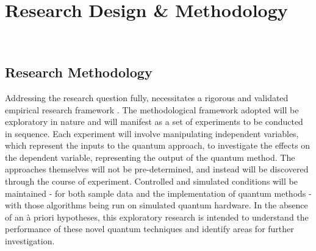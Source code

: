 \section{Research Design \& Methodology}~\label{sec:design}
\subsection{Research Methodology}


Addressing the research question fully, necessitates a rigorous and validated empirical research framework \cite{basili_experimentation_1985}.
The methodological framework adopted will be exploratory in nature and will manifest as a set of experiments to be conducted in sequence.
Each experiment will involve manipulating independent variables, which represent the inputs to the quantum approach, to investigate the effects on the dependent variable, representing the output of the quantum method.
The approaches themselves will not be pre-determined, and instead will be discovered through the course of experiment.
Controlled and simulated conditions will be maintained - for both sample data and the implementation of quantum methods - with those algorithms being run on simulated quantum hardware.
In the absence of an \`{a} priori hypotheses, this exploratory research is intended to understand the performance of these novel quantum techniques and identify areas for further investigation.

